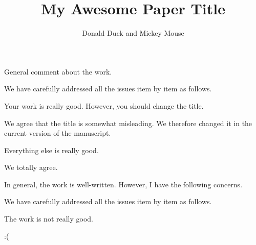 \documentclass[12pt,USenglish]{scrartcl}
\title{My Awesome Paper Title}
\author{Donald Duck and Mickey Mouse}
\begin{document}
\printtitlepage


\reviewer
\begin{generalcomment}
	General comment about the work.
\end{generalcomment}
\begin{revresponse}
	We have carefully addressed all the issues item by item as follows.
\end{revresponse}

\begin{revcomment}
	Your work is really good. However, you should change the title.
\end{revcomment}
\begin{revresponse}
	We agree that the title is somewhat misleading. We therefore changed it in the current version of the manuscript.
\end{revresponse}

\begin{revcomment}
	Everything else is really good.
\end{revcomment}
\begin{revresponse}
	We totally agree.
\end{revresponse}

\reviewer
\begin{generalcomment}
	In general, the work is well-written. However, I have the following concerns.
\end{generalcomment}
\begin{revresponse}
	We have carefully addressed all the issues item by item as follows.
\end{revresponse}

\begin{revcomment}
	The work is not really good.
\end{revcomment}
\begin{revresponse}
	:(
\end{revresponse}
\end{document}
